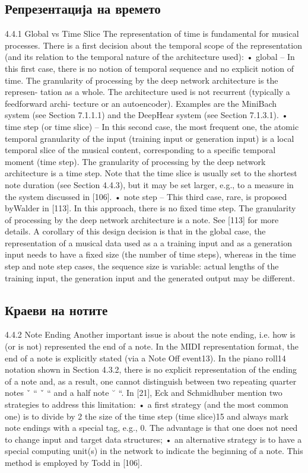 \subsection{Репрезентација на времето}
4.4.1 Global vs Time Slice
The representation of time is fundamental for musical processes. There is a first decision about the temporal scope of the representation (and its relation to the temporal nature of the architecture used):
• global – In this first case, there is no notion of temporal sequence and no explicit notion of time. The granularity of processing by the deep network architecture is the represen-
tation as a whole. The architecture used is not recurrent (typically a feedforward archi- tecture or an autoencoder). Examples are the MiniBach system (see Section 7.1.1.1) and the DeepHear system (see Section 7.1.3.1).
• time step (or time slice) – In this second case, the most frequent one, the atomic temporal granularity of the input (training input or generation input) is a local temporal slice
of the musical content, corresponding to a specific temporal moment (time step). The granularity of processing by the deep network architecture is a time step. Note that the time slice is usually set to the shortest note duration (see Section 4.4.3), but it may be set larger, e.g., to a measure in the system discussed in [106].
• note step – This third case, rare, is proposed byWalder in [113]. In this approach, there is no fixed time step. The granularity of processing by the deep network architecture is
a note. See [113] for more details. A corollary of this design decision is that in the global case, the representation of a
musical data used as a a training input and as a generation input needs to have a fixed size (the number of time steps), whereas in the time step and note step cases, the sequence size is variable: actual lengths of the training input, the generation input and the generated output may be different.

\subsection{Краеви на нотите}
4.4.2 Note Ending
Another important issue is about the note ending, i.e. how is (or is not) represented the end of a note. In the MIDI representation format, the end of a note is explicitly stated (via a Note Off event13). In the piano roll14 notation shown in Section 4.3.2, there is no explicit representation of the ending of a note and, as a result, one cannot distinguish between two
repeating quarter notes ˇ “ ˇ “ and a half note ˘ “. In [21], Eck and Schmidhuber mention two strategies to address this limitation:
• a first strategy (and the most common one) is to divide by 2 the size of the time step (time slice)15 and always mark note endings with a special tag, e.g., 0. The advantage is
that one does not need to change input and target data structures;
• an alternative strategy is to have a special computing unit(s) in the network to indicate the beginning of a note. This method is employed by Todd in [106].

